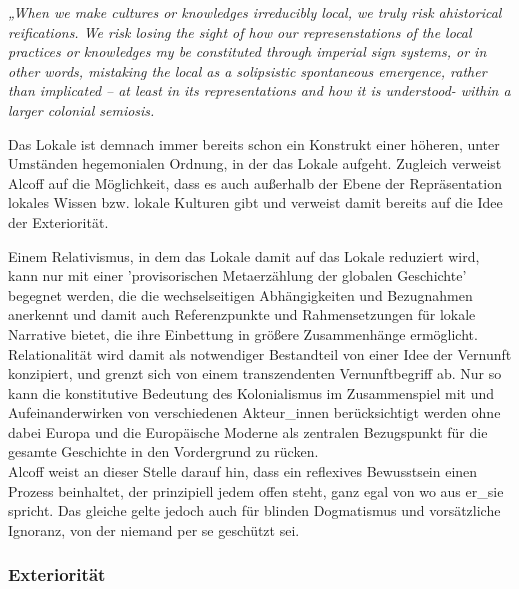\begin{myenv}
    \textit{„When we make cultures or knowledges irreducibly local, we truly
    risk ahistorical reifications. We risk losing the sight of how our
    represenstations of the local practices or knowledges my be constituted
    through imperial sign systems, or in other words, mistaking the local as a
    solipsistic spontaneous emergence, rather than implicated – at least in its
    representations and how it is understood- within a larger colonial
    semiosis.\footnotemark {}}
\end{myenv}

Das Lokale ist demnach immer bereits schon ein Konstrukt einer höheren, unter
Umständen hegemonialen Ordnung, in der das Lokale aufgeht. Zugleich verweist
Alcoff auf die Möglichkeit, dass es auch außerhalb der Ebene der Repräsentation
lokales Wissen bzw. lokale Kulturen gibt und verweist damit bereits auf die Idee
der Exteriorität.

Einem Relativismus, in dem das Lokale damit auf das Lokale reduziert wird, kann
nur mit einer 'provisorischen Metaerzählung der globalen Geschichte' begegnet
werden, die die wechselseitigen Abhängigkeiten und Bezugnahmen anerkennt und
damit auch Referenzpunkte und Rahmensetzungen für lokale Narrative bietet, die
ihre Einbettung in größere Zusammenhänge ermöglicht.\\
 Relationalität wird damit
als notwendiger Bestandteil von einer Idee der Vernunft konzipiert, und grenzt
sich von einem transzendenten Vernunftbegriff ab. Nur so kann die konstitutive
Bedeutung des Kolonialismus im Zusammenspiel mit und Aufeinanderwirken von
verschiedenen Akteur\_innen berücksichtigt werden ohne dabei Europa und die
Europäische Moderne als zentralen Bezugspunkt für die gesamte Geschichte in den
Vordergrund zu rücken.
\\

 Alcoff weist an dieser Stelle darauf hin, dass ein
reflexives Bewusstsein einen Prozess beinhaltet, der prinzipiell jedem offen
steht, ganz egal von wo aus er\_sie spricht. Das gleiche gelte jedoch auch für
blinden Dogmatismus und vorsätzliche Ignoranz, von der niemand per se geschützt
sei.\footnotemark {}

\subsubsection{Exteriorität}

